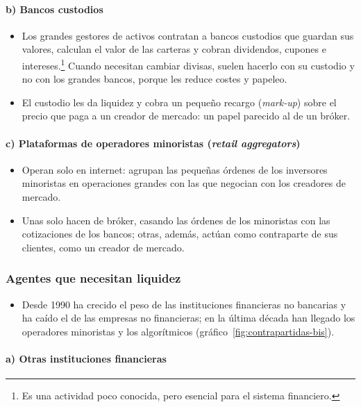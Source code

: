 \documentclass[11pt]{article}
\begin{document}
\paragraph{b) Bancos custodios}

\begin{itemize}
\item Los grandes gestores de activos contratan a bancos custodios que guardan sus valores, calculan el valor de las carteras y cobran dividendos, cupones e intereses.\footnote{Es una actividad poco conocida, pero esencial para el sistema financiero.} Cuando necesitan cambiar divisas, suelen hacerlo con su custodio y no con los grandes bancos, porque les reduce costes y papeleo.
\item El custodio les da liquidez y cobra un pequeño recargo (\emph{mark-up}) sobre el precio que paga a un creador de mercado: un papel parecido al de un bróker.
\end{itemize}

\paragraph{c) Plataformas de operadores minoristas (\emph{retail aggregators})}

\begin{itemize}
\item Operan solo en internet: agrupan las pequeñas órdenes de los inversores minoristas en operaciones grandes con las que negocian con los creadores de mercado.
\item Unas solo hacen de bróker, casando las órdenes de los minoristas con las cotizaciones de los bancos; otras, además, actúan como contraparte de sus clientes, como un creador de mercado.
\end{itemize}

\subsubsection{Agentes que necesitan liquidez}\label{sec:usuarios}

\begin{itemize}
\item Desde 1990 ha crecido el peso de las instituciones financieras no bancarias y ha caído el de las empresas no financieras; en la última década han llegado los operadores minoristas y los algorítmicos (gráfico~\ref{fig:contrapartidas-bis}).
\end{itemize}

\paragraph{a) Otras instituciones financieras}
\end{document}
